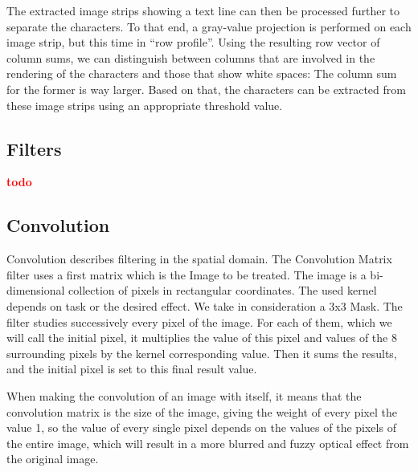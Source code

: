 \documentclass[a4paper,twocolumn]{article}
\newcommand{\twodo}{\vspace{11pt}\textcolor{red}{\textbf{todo}}}
\begin{document}
	The extracted image strips showing a text line can then be processed further to separate the characters. To that end, a gray-value projection is performed on each image strip, but this time in ``row profile''. Using the resulting row vector of column sums, we can distinguish between columns that are involved in the rendering of the characters and those that show white spaces: The column sum for the former is way larger. Based on that, the characters can be extracted from these image strips using an appropriate threshold value.
	
	\subsection{Filters}
	
	\twodo{}
	
	
	\subsection{Convolution}
	
	Convolution describes filtering in the spatial domain. The Convolution Matrix  filter uses a  first matrix which is the Image to be treated. The image is a bi-dimensional collection of pixels in rectangular coordinates. The used kernel depends on task or the desired effect. We take in consideration a 3x3 Mask. The  filter studies successively every pixel of the image. For each of them, which we will call the  initial pixel, it multiplies the value of this pixel and values of the 8 surrounding pixels by the kernel corresponding value. Then it sums the results, and the initial pixel is set to this  final result value.
	
	When making the convolution of an image with itself, it means that the convolution matrix is the size of the image, giving the weight of every pixel the value 1, so the value of every single pixel depends on the values of the pixels of the entire image, which will result in a more blurred and fuzzy optical effect from the original image.
	
\end{document}
